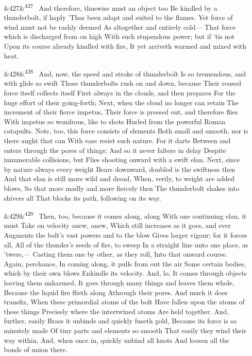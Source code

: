 \documentclass[12pt]{article}
\newcommand{\para}[1][]{\par\noindent\ifx&#1&\else\textsuperscript{\footnotesize #1}~\fi}
\begin{document}
\para[427] And therefore, thuswise must an object too Be kindled by a thunderbolt, if haply 'Thas been adapt and suited to the flames. Yet force of wind must not be rashly deemed As altogether and entirely cold--- That force which is discharged from on high With such stupendous power; but if 'tis not Upon its course already kindled with fire, It yet arriveth warmed and mixed with heat.

\para[428] And, now, the speed and stroke of thunderbolt Is so tremendous, and with glide so swift Those thunderbolts rush on and down, because Their roused force itself collects itself First always in the clouds, and then prepares For the huge effort of their going-forth; Next, when the cloud no longer can retain The increment of their fierce impetus, Their force is pressed out, and therefore flies With impetus so wondrous, like to shots Hurled from the powerful Roman catapults. Note, too, this force consists of elements Both small and smooth, nor is there aught that can With ease resist such nature. For it darts Between and enters through the pores of things; And so it never falters in delay Despite innumerable collisions, but Flies shooting onward with a swift elan. Next, since by nature always every weight Bears downward, doubled is the swiftness then And that elan is still more wild and dread, When, verily, to weight are added blows, So that more madly and more fiercely then The thunderbolt shakes into shivers all That blocks its path, following on its way.

\para[429] Then, too, because it comes along, along With one continuing elan, it must Take on velocity anew, anew, Which still increases as it goes, and ever Augments the bolt's vast powers and to the blow Gives larger vigour; for it forces all, All of the thunder's seeds of fire, to sweep In a straight line unto one place, as 'twere,--- Casting them one by other, as they roll, Into that onward course. Again, perchance, In coming along, it pulls from out the air Some certain bodies, which by their own blows Enkindle its velocity. And, lo, It comes through objects leaving them unharmed, It goes through many things and leaves them whole, Because the liquid fire flieth along Athrough their pores. And much it does transfix, When these primordial atoms of the bolt Have fallen upon the atoms of these things Precisely where the intertwined atoms Are held together. And, further, easily Brass it unbinds and quickly fuseth gold, Because its force is so minutely made Of tiny parts and elements so smooth That easily they wind their way within, And, when once in, quickly unbind all knots And loosen all the bonds of union there.
\end{document}
